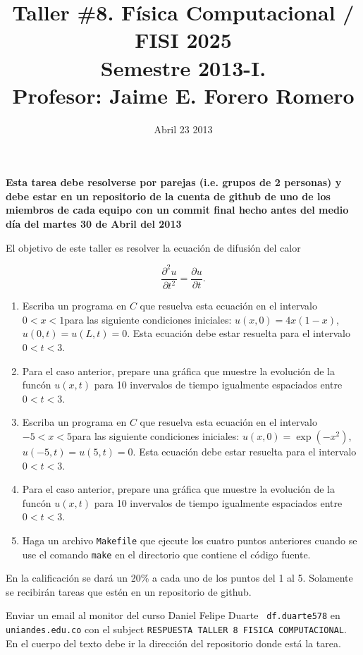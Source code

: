 \documentclass{article}
\title{Taller \#8. F\'isica Computacional / FISI 2025 \\Semestre
  2013-I. \\ Profesor: Jaime E. Forero Romero}
\date{Abril 23 2013}
\begin{document}
\maketitle

{\bf Esta tarea debe resolverse por parejas (i.e. grupos de 2
  personas) y debe estar en un repositorio de la cuenta de github de
  uno de los miembros de cada equipo con un commit final hecho antes del
  medio d\'ia del martes 30 de Abril del 2013}  

El objetivo de este taller es resolver la ecuaci\'on de difusi\'on del calor

\begin{equation}
\frac{\partial^2u}{\partial t^2} = \frac{\partial u}{\partial t}.
\end{equation}

\begin{enumerate}

\item 
Escriba un programa en $C$ que resuelva esta ecuaci\'on en el intervalo $0<x<1$para las siguiente condiciones iniciales: $u(x,0) = 4x(1-x)$, $u(0,t)= u(L,t)=0$. Esta ecuaci\'on debe estar resuelta para el intervalo $0<t<3$.


\item
Para el caso anterior, prepare una gr\'afica que muestre la evoluci\'on de la func\'on $u(x,t)$ para 10 invervalos de tiempo igualmente espaciados entre $0<t<3$.


\item 

Escriba un programa en $C$ que resuelva esta ecuaci\'on en el intervalo $-5<x<5$para las siguiente condiciones iniciales: $u(x,0) = \exp(-x^2)$, $u(-5,t)= u(5,t)=0$. Esta ecuaci\'on debe estar resuelta para el intervalo $0<t<3$.

\item
Para el caso anterior, prepare una gr\'afica que muestre la evoluci\'on de la func\'on $u(x,t)$ para 10 invervalos de tiempo igualmente espaciados entre $0<t<3$.

\item 
Haga un archivo \verb"Makefile" que ejecute los cuatro puntos anteriores
cuando se use el comando \verb"make" en el directorio que contiene el
c\'odigo fuente.   
\end{enumerate}

En la calificaci\'on se dar\'a un 20\% a cada uno de los puntos del 1
al 5. Solamente se recibir\'an tareas que est\'en en un repositorio de
github. 

Enviar un email al monitor del curso Daniel Felipe Duarte {\tt
  df.duarte578} en {\tt uniandes.edu.co} con el subject
\verb"RESPUESTA TALLER 8 FISICA COMPUTACIONAL". En el cuerpo del texto
debe ir la direcci\'on del repositorio donde est\'a la tarea. 
\end{document}

